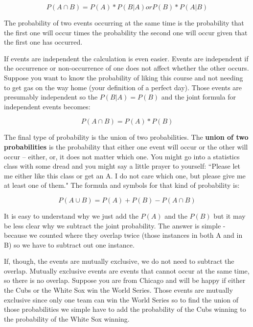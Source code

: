 \documentclass[11pt,openany]{book}\usepackage[]{graphicx}\usepackage[]{color}
\begin{document}
{\begin{equation}
  \label{eq_label1}
  P(A \cap B) = P(A) * P(B|A) or P(B) * P(A|B)
\end{equation}

The probability of two events occurring at the same time is the probability that the first one will occur times the probability the second one will occur given that the first one has occurred.  

If events are independent the calculation is even easier.  Events are independent if the occurrence or non-occurrence of one does not affect whether the other occurs.  Suppose you want to know the probability of liking this course and not needing to get gas on the way home (your definition of a perfect day).  Those events are presumably independent so the $P(B|A) = P(B)$ and the joint formula for independent events becomes:

\begin{equation}
  \label{eq_label2}
  P(A \cap B) = P(A) * P(B)
\end{equation}

The final type of probability is the union of two probabilities.  The \textbf{union of two probabilities} is the probability that either one event will occur or the other will occur -- either, or, it does not matter which one.  You might go into a statistics class with some dread and you might say a little prayer to yourself: ``Please let me either like this class or get an A.  I do not care which one, but please give me at least one of them."  The formula and symbols for that kind of probability is:

\begin{equation}
  \label{eq_label3}
  P(A \cup B) = P(A) + P(B) - P(A \cap B)
\end{equation}

It is easy to understand why we just add the $P(A)$ and the $P(B)$ but it may be less clear why we subtract the joint probability.   The answer is simple - because we counted where they overlap twice (those instances in both A and in B) so we have to subtract out one instance.  

If, though, the events are mutually exclusive, we do not need to subtract the overlap.  Mutually exclusive events are events that cannot occur at the same time, so there is no overlap.  Suppose you are from Chicago and will be happy if either the Cubs or the White Sox win the World Series.  Those events are mutually exclusive since only one team can win the World Series so to find the union of those probabilities we simple have to add the probability of the Cubs winning to the probability of the White Sox winning.

}
\end{document}
